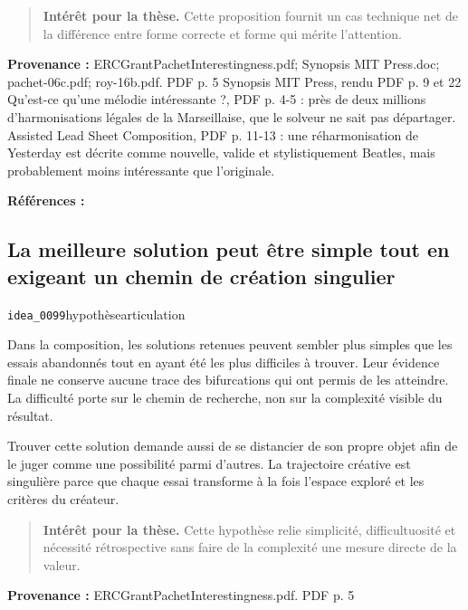\documentclass[10pt,a4paper]{article}
\begin{document}
\begin{quote}
\textbf{Intérêt pour la thèse.} Cette proposition fournit un cas technique net de la différence entre forme correcte et forme qui mérite l'attention.
\end{quote}
{\footnotesize\color{metadata}\textbf{Provenance :} ERCGrantPachetInterestingness.pdf; Synopsis MIT Press.doc; pachet-06c.pdf; roy-16b.pdf. PDF p. 5 Synopsis MIT Press, rendu PDF p. 9 et 22 Qu'est-ce qu'une mélodie intéressante ?, PDF p. 4-5 : près de deux millions d'harmonisations légales de la Marseillaise, que le solveur ne sait pas départager. Assisted Lead Sheet Composition, PDF p. 11-13 : une réharmonisation de Yesterday est décrite comme nouvelle, valide et stylistiquement Beatles, mais probablement moins intéressante que l'originale.\par}
{\footnotesize\color{metadata}\textbf{Références :} \parencite{pachet2000melodie,papadopoulos2016flowcomposer}\par}

\subsection{La meilleure solution peut être simple tout en exigeant un chemin de création singulier}
{\small\color{metadata} \texttt{idea\_0099}\quad\textbullet\quad hypothèse\quad\textbullet\quad articulation\par}

Dans la composition, les solutions retenues peuvent sembler plus simples que les essais abandonnés tout en ayant été les plus difficiles à trouver. Leur évidence finale ne conserve aucune trace des bifurcations qui ont permis de les atteindre. La difficulté porte sur le chemin de recherche, non sur la complexité visible du résultat.

Trouver cette solution demande aussi de se distancier de son propre objet afin de le juger comme une possibilité parmi d'autres. La trajectoire créative est singulière parce que chaque essai transforme à la fois l'espace exploré et les critères du créateur.

\begin{quote}
\textbf{Intérêt pour la thèse.} Cette hypothèse relie simplicité, difficultuosité et nécessité rétrospective sans faire de la complexité une mesure directe de la valeur.
\end{quote}
{\footnotesize\color{metadata}\textbf{Provenance :} ERCGrantPachetInterestingness.pdf. PDF p. 5\par}
\end{document}
